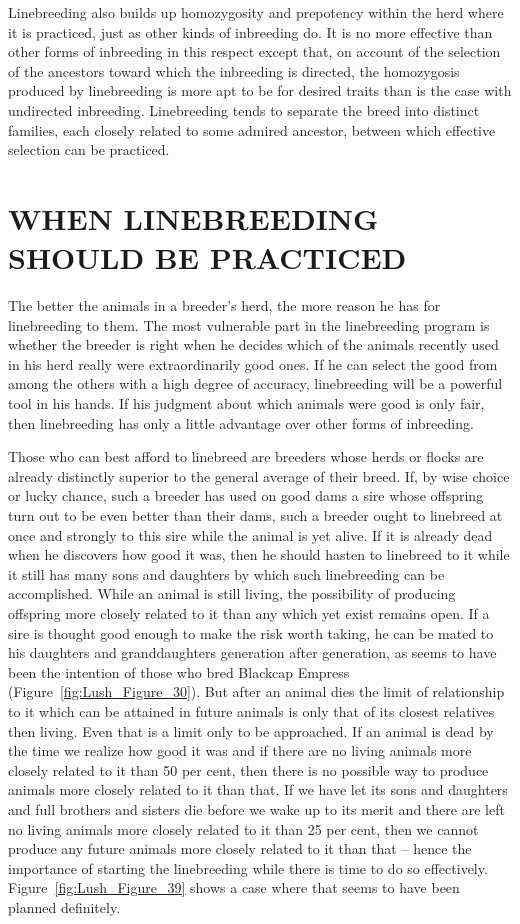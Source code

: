 Linebreeding also builds up homozygosity and prepotency within
the herd where it is practiced, just as other kinds of inbreeding do. It is
no more effective than other forms of inbreeding in this respect except
that, on account of the selection of the ancestors toward which the
inbreeding is directed, the homozygosis produced by linebreeding is
more apt to be for desired traits than is the case with undirected
inbreeding. Linebreeding tends to separate the breed into distinct families,
each closely related to some admired ancestor, between which
effective selection can be practiced.

\section*{WHEN LINEBREEDING SHOULD BE PRACTICED}

The better the animals in a breeder's herd, the more reason he has
for linebreeding to them. The most vulnerable part in the linebreeding
program is whether the breeder is right when he decides which of the
animals recently used in his herd really were extraordinarily good ones.
If he can select the good from among the others with a high degree of
accuracy, linebreeding will be a powerful tool in his hands. If his judgment
about which animals were good is only fair, then linebreeding has
only a little advantage over other forms of inbreeding.

Those who can best afford to linebreed are breeders whose herds or
flocks are already distinctly superior to the general average of their
breed. If, by wise choice or lucky chance, such a breeder has used on
good dams a sire whose offspring turn out to be even better than their
dams, such a breeder ought to linebreed at once and strongly to this
sire while the animal is yet alive. If it is already dead when he discovers
how good it was, then he should hasten to linebreed to it while it still
has many sons and daughters by which such linebreeding can be accomplished.
While an animal is still living, the possibility of producing offspring
more closely related to it than any which yet exist remains open.
If a sire is thought good enough to make the risk worth taking, he can
be mated to his daughters and granddaughters generation after generation,
as seems to have been the intention of those who bred Blackcap
Empress (Figure~\ref{fig:Lush_Figure_30}). But after an animal dies the limit of relationship
to it which can be attained in future animals is only that of its closest
relatives then living. Even that is a limit only to be approached. If an
animal is dead by the time we realize how good it was and if there are
no living animals more closely related to it than 50 per cent, then there
is no possible way to produce animals more closely related to it than
that. If we have let its sons and daughters and full brothers and sisters
die before we wake up to its merit and there are left no living animals
more closely related to it than 25 per cent, then we cannot produce any
future animals more closely related to it than that -- hence the importance
of starting the linebreeding while there is time to do so effectively.
Figure~\ref{fig:Lush_Figure_39} shows a case where that seems to have been
planned definitely.

